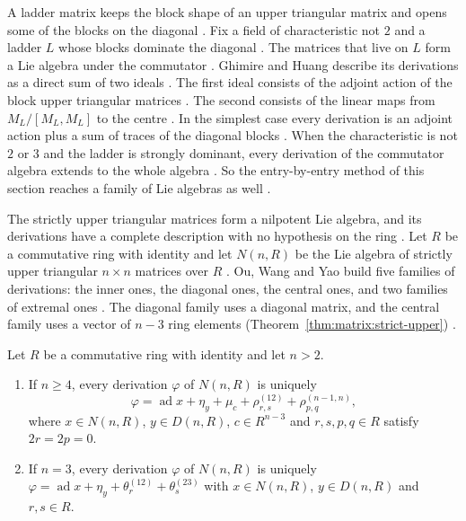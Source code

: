 A ladder matrix keeps the block shape of an upper triangular matrix and opens
some of the blocks on the diagonal \cite[p.~1]{GhimireHuang2015}. Fix a field
of characteristic not $2$ and a ladder $L$ whose blocks dominate the diagonal
\cite[Definition~2.2, p.~2]{GhimireHuang2015}. The matrices that live on $L$
form a Lie algebra under the commutator \cite[p.~1]{GhimireHuang2015}. Ghimire
and Huang describe its derivations as a direct sum of two ideals
\cite[Theorem~3.1, p.~7]{GhimireHuang2015}. The first ideal consists of the
adjoint action of the block upper triangular matrices
\cite[p.~7]{GhimireHuang2015}. The second consists of the linear maps from
$M_L/[M_L,M_L]$ to the centre \cite[p.~7]{GhimireHuang2015}. In the simplest
case every derivation is an adjoint action plus a sum of traces of the
diagonal blocks \cite[p.~7]{GhimireHuang2015}. When the characteristic is not
$2$ or $3$ and the ladder is strongly dominant, every derivation of the
commutator algebra extends to the whole algebra \cite[Theorem~5.3 and
Corollary~5.4, p.~18]{GhimireHuang2015}. So the entry-by-entry method of this
section reaches a family of Lie algebras as well
\cite[p.~1]{GhimireHuang2015}.

The strictly upper triangular matrices form a nilpotent Lie algebra, and its
derivations have a complete description with no hypothesis on the ring
\cite[p.~378]{OuWangYao2007}. Let $R$ be a commutative ring with identity and
let $N(n,R)$ be the Lie algebra of strictly upper triangular $n\times n$
matrices over $R$ \cite[p.~378]{OuWangYao2007}. Ou, Wang and Yao build five
families of derivations: the inner ones, the diagonal ones, the central ones,
and two families of extremal ones \cite[pp.~379--380]{OuWangYao2007}. The
diagonal family uses a diagonal matrix, and the central family uses a vector
of $n-3$ ring elements (Theorem~\ref{thm:matrix:strict-upper})
\cite[pp.~379--380]{OuWangYao2007}.

\begin{theorem}\label{thm:matrix:strict-upper}
Let $R$ be a commutative ring with identity and let $n>2$.
\begin{enumerate}
\item If $n\geq4$, every derivation $\varphi$ of $N(n,R)$ is uniquely
\[
\varphi=\operatorname{ad}x+\eta_y+\mu_c+\rho^{(12)}_{r,s}+\rho^{(n-1,n)}_{p,q},
\]
where $x\in N(n,R)$, $y\in D(n,R)$, $c\in R^{n-3}$ and $r,s,p,q\in R$ satisfy
$2r=2p=0$.
\item If $n=3$, every derivation $\varphi$ of $N(n,R)$ is uniquely
$\varphi=\operatorname{ad}x+\eta_y+\theta^{(12)}_r+\theta^{(23)}_s$ with
$x\in N(n,R)$, $y\in D(n,R)$ and $r,s\in R$.
\end{enumerate}
\end{theorem}

